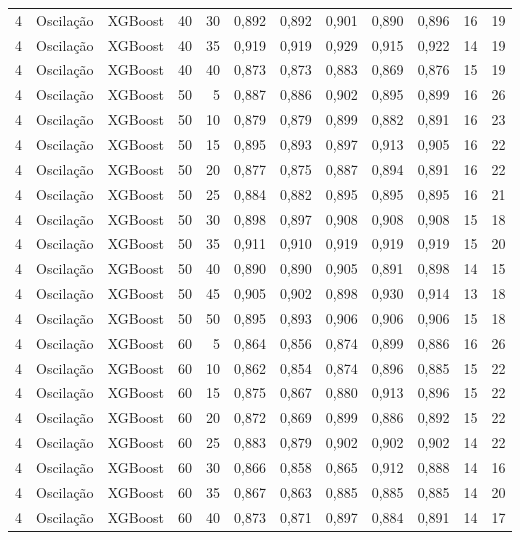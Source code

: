 \begin{longtable}{@{}rllrrrrrrrrr@{}}
4 & Oscilação & XGBoost & 40 & 30 & 0,892 & 0,892 & 0,901 & 0,890 & 0,896 & 16 & 19 \\
4 & Oscilação & XGBoost & 40 & 35 & 0,919 & 0,919 & 0,929 & 0,915 & 0,922 & 14 & 19 \\
4 & Oscilação & XGBoost & 40 & 40 & 0,873 & 0,873 & 0,883 & 0,869 & 0,876 & 15 & 19 \\
4 & Oscilação & XGBoost & 50 & 5 & 0,887 & 0,886 & 0,902 & 0,895 & 0,899 & 16 & 26 \\
4 & Oscilação & XGBoost & 50 & 10 & 0,879 & 0,879 & 0,899 & 0,882 & 0,891 & 16 & 23 \\
4 & Oscilação & XGBoost & 50 & 15 & 0,895 & 0,893 & 0,897 & 0,913 & 0,905 & 16 & 22 \\
4 & Oscilação & XGBoost & 50 & 20 & 0,877 & 0,875 & 0,887 & 0,894 & 0,891 & 16 & 22 \\
4 & Oscilação & XGBoost & 50 & 25 & 0,884 & 0,882 & 0,895 & 0,895 & 0,895 & 16 & 21 \\
4 & Oscilação & XGBoost & 50 & 30 & 0,898 & 0,897 & 0,908 & 0,908 & 0,908 & 15 & 18 \\
4 & Oscilação & XGBoost & 50 & 35 & 0,911 & 0,910 & 0,919 & 0,919 & 0,919 & 15 & 20 \\
4 & Oscilação & XGBoost & 50 & 40 & 0,890 & 0,890 & 0,905 & 0,891 & 0,898 & 14 & 15 \\
4 & Oscilação & XGBoost & 50 & 45 & 0,905 & 0,902 & 0,898 & 0,930 & 0,914 & 13 & 18 \\
4 & Oscilação & XGBoost & 50 & 50 & 0,895 & 0,893 & 0,906 & 0,906 & 0,906 & 15 & 18 \\
4 & Oscilação & XGBoost & 60 & 5 & 0,864 & 0,856 & 0,874 & 0,899 & 0,886 & 16 & 26 \\
4 & Oscilação & XGBoost & 60 & 10 & 0,862 & 0,854 & 0,874 & 0,896 & 0,885 & 15 & 22 \\
4 & Oscilação & XGBoost & 60 & 15 & 0,875 & 0,867 & 0,880 & 0,913 & 0,896 & 15 & 22 \\
4 & Oscilação & XGBoost & 60 & 20 & 0,872 & 0,869 & 0,899 & 0,886 & 0,892 & 15 & 22 \\
4 & Oscilação & XGBoost & 60 & 25 & 0,883 & 0,879 & 0,902 & 0,902 & 0,902 & 14 & 22 \\
4 & Oscilação & XGBoost & 60 & 30 & 0,866 & 0,858 & 0,865 & 0,912 & 0,888 & 14 & 16 \\
4 & Oscilação & XGBoost & 60 & 35 & 0,867 & 0,863 & 0,885 & 0,885 & 0,885 & 14 & 20 \\
4 & Oscilação & XGBoost & 60 & 40 & 0,873 & 0,871 & 0,897 & 0,884 & 0,891 & 14 & 17 \\

\end{longtable}
